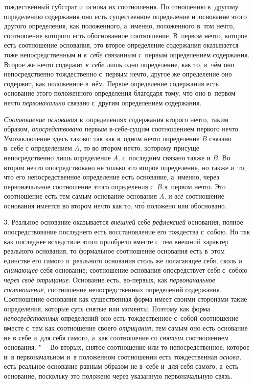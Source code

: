 тождественный субстрат и~основа их соотношения. По отношению к~другому
определению содержания оно есть существенное определение и~основание этого
другого определения, как положенного, а~именно, положенного в~том нечто,
соотношение которого есть обоснованное соотношение. В~первом нечто, которое
есть соотношение основания, это второе определение содержания оказывается
тоже непосредственным и {\em в~себе} связанным с~первым
определением содержания. Второе же нечто содержит
{\em в~себе} лишь одно определение, как то, в~чём оно
непосредственно тождественно с~первым нечто, другое же определение оно
содержит, как положенное в~нём. Первое определение содержания есть
основание этого положенного определения благодаря тому, что оно в~первом
нечто {\em первоначально} связано с~другим определением
содержания.

{\em Соотношение основания} в~определениях содержания
второго нечто, таким образом, {\em опосредствовано}
первым в-себе-сущим соотношением первого нечто. Умозаключение здесь таково:
так как в~одном нечто определение $B$ связано в~себе
с определением $A$, то во втором нечто,
которому присуще непосредственно лишь определение
$A$, с~последним связано также и
$B$. Во втором нечто опосредствовано не только это
второе определение, но также и~то, что его непосредственное определение
есть основание, а~именно, через первоначальное соотношение этого
определения с~$B$ в~первом нечто. Это соотношение
есть тем самым основание основания $A$, и
{\em всё} соотношение основания имеется во втором нечто
как то, чт\'{о} положено или обосновано.

3. Реальное основание оказывается {\em внешней} себе
{\em рефлексией} основания; полное опосредствование
последнего есть восстановление его тождества с~собою. Но так как последнее
вследствие этого приобрело вместе с~тем внешний характер реального
основания, то формальное соотношение основания есть в~этом единстве его
самого и~реального основания столь же полагающее себя, сколь и
{\em снимающее} себя основание; соотношение основания
опосредствует себя с~собою {\em через своё отрицание}.
Основание есть, во-первых, как {\em первоначальное соотношение,}
соотношение непосредственных
определений содержания. Соотношение основания как существенная форма имеет
своими сторонами такие определения, которые суть снятые или моменты.
Поэтому как форма {\em непосредственных} определений
оно есть тождественное с~собой соотношение вместе с~тем как соотношение
своего {\em отрицания;} тем самым оно есть основание не
в себе и~для себя самого, а~как соотношение со
{\em снятым} соотношением основания. "--- Во-вторых,
снятое соотношение или то непосредственное, которое и~в первоначальном и~в
положенном соотношении есть тождественная {\em основа,}
есть реальное основание равным образом не в~себе и~для себя самого, а~есть
основание, поскольку это положено через указанную первоначальную связь.

